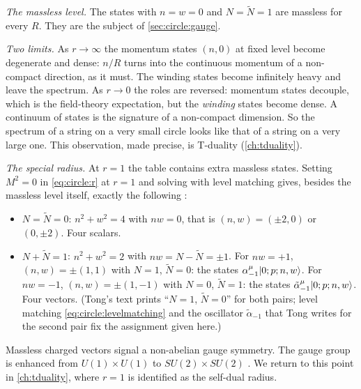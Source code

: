 \emph{The massless level.} The states with $n=w=0$ and $N=\tilde N=1$ are massless for every
$R$. They are the subject of \cref{sec:circle:gauge}.

\emph{Two limits.} As $r\to\infty$ the momentum states $(n,0)$ at fixed level become
degenerate and dense: $n/R$ turns into the continuous momentum of a non-compact direction, as
it must. The winding states become infinitely heavy and leave the spectrum. As $r\to0$ the
roles are reversed: momentum states decouple, which is the field-theory expectation, but the
\emph{winding} states become dense. A continuum of states is the signature of a non-compact
dimension. So the spectrum of a string on a very small circle looks like that of a string on
a very large one. This observation, made precise, is T-duality (\cref{ch:tduality}).

\emph{The special radius.} At $r=1$ the table contains extra massless states. Setting
$M^2=0$ in \eqref{eq:circle:r} at $r=1$ and solving with level matching gives, besides the
massless level itself, exactly the following :
\begin{itemize}[leftmargin=*]
\item $N=\tilde N=0$: $n^2+w^2=4$ with $nw=0$, that is $(n,w)=(\pm2,0)$ or $(0,\pm2)$. Four
scalars.
\item $N+\tilde N=1$: $n^2+w^2=2$ with $nw=N-\tilde N=\pm1$. For $nw=+1$,
$(n,w)=\pm(1,1)$ with $N=1$, $\tilde N=0$: the states
$\alpha_{-1}^\mu|0;p;n,w\rangle$. For $nw=-1$, $(n,w)=\pm(1,-1)$ with $N=0$, $\tilde N=1$:
the states $\tilde\alpha_{-1}^\mu|0;p;n,w\rangle$. Four vectors. (Tong's text prints
``$N=1$, $\tilde N=0$'' for both pairs; level matching \eqref{eq:circle:levelmatching} and the
oscillator $\tilde\alpha_{-1}$ that Tong writes for the second pair fix the assignment given
here.)
\end{itemize}
Massless charged vectors signal a non-abelian gauge symmetry. The gauge group is enhanced
from $U(1)\times U(1)$ to $SU(2)\times SU(2)$ \TL. We return to
this point in \cref{ch:tduality}, where $r=1$ is identified as the self-dual radius.

